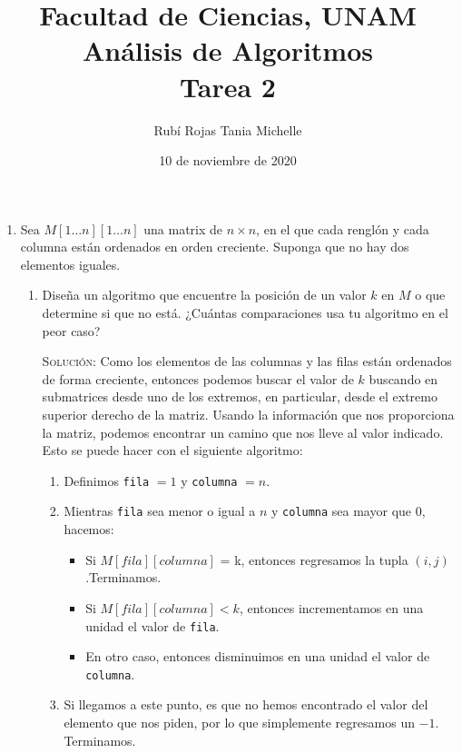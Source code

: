 \documentclass[letterpaper,11pt]{article}
\title{Facultad de Ciencias, UNAM \\ 
       Análisis de Algoritmos \\ 
       Tarea 2}
\author{Rubí Rojas Tania Michelle}
\date{10 de noviembre de 2020}
\begin{document}
\maketitle

\begin{enumerate}
    \item Sea $M [1 \dots n][1 \dots n]$ una matrix de $n \times n$, en el que 
    cada renglón y cada columna están ordenados en orden creciente. Suponga que 
    no hay dos elementos iguales.
    
    \begin{enumerate}
        \item Diseña un algoritmo que encuentre la posición de un valor $k$ en 
        $M$ o que determine si que no está. ¿Cuántas comparaciones usa tu 
        algoritmo en el peor caso?

        \textsc{Solución:} Como los elementos de las columnas y las filas 
        están ordenados de forma creciente, entonces podemos buscar el valor 
        de $k$ buscando en submatrices desde uno de los extremos, en 
        particular, desde el extremo superior derecho de la matriz. Usando la 
        información que nos proporciona la matriz, podemos encontrar un 
        camino que nos lleve al valor indicado. Esto se puede hacer con el 
        siguiente algoritmo:
        \begin{enumerate}
            \item Definimos \texttt{fila} $= 1$ y  \texttt{columna} $= n$.

            \item Mientras \texttt{fila} sea menor o igual a $n$ y 
            \texttt{columna} sea mayor que $0$, 
            hacemos:
            \begin{itemize}
                \item Si $M[fila][columna]$ = k, entonces regresamos la tupla 
                $(i,j)$.Terminamos.

                \item Si $M[fila][columna] < k$, entonces incrementamos en 
                una unidad el valor de \texttt{fila}.

                \item En otro caso, entonces disminuimos en una unidad el 
                valor de \texttt{columna}.
            \end{itemize}

            \item Si llegamos a este punto, es que no hemos encontrado el 
            valor del elemento que nos piden, por lo que simplemente regresamos 
            un $-1$. Terminamos. 
        \end{enumerate}


\end{enumerate}
\end{enumerate}
\end{document}
